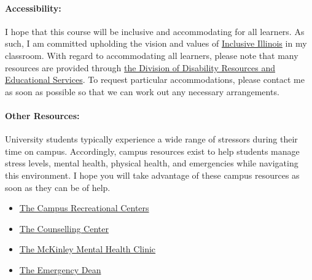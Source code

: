 \documentclass[11pt, a4paper]{article}
\begin{document}
\paragraph{Accessibility:} I hope that this course will be inclusive and
accommodating for all learners. As such, I am committed upholding the vision
and values of \href{http://www.inclusiveillinois.illinois.edu/index.html}{Inclusive Illinois}
in my
classroom.  With regard to accommodating all learners, please note that many
resources are provided through
\href{http://disability.illinois.edu/academic-support/accommodations}{the
Division of Disability Resources and Educational Services}.  To request
particular accommodations, please contact me as soon as possible so that we can
work out any necessary arrangements.

\paragraph{Other Resources:}
University students typically experience a wide range of stressors during their
time on campus. Accordingly, campus resources exist to help students manage
stress levels, mental health, physical health, and emergencies while navigating
this environment. I hope you will take advantage of these campus resources as
soon as they can be of help.

\begin{itemize}
\item \href{https://campusrec.illinois.edu/}{The Campus Recreational Centers}
\item \href{http://counselingcenter.illinois.edu/}{The Counselling Center}
\item \href{http://www.mckinley.illinois.edu/clinics/mental\_health.htm}{The McKinley Mental Health Clinic}
\item \href{http://odos.illinois.edu/emergency/}{The Emergency Dean}
\end{itemize}
\end{document}
